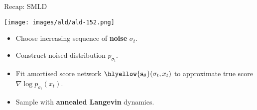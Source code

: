\begin{frame}{Recap: SMLD}
 \begin{center}
        \texttt{[image: images/ald/ald-152.png]}
    \end{center}
\begin{itemize} [triangle]
    \item Choose increasing sequence of \textbf{noise} $\sigma_t$.
    \item Construct noised distribution $p_{\sigma_t}$.
    \item Fit amortised score network $\hlyellow{\mathbf{s}_\theta}(\sigma_t, x_t)$ to approximate true score $\nabla \log p_{\sigma_t}(x_t)$.
    \item Sample with \textbf{annealed Langevin} dynamics.
\end{itemize}
%
\end{frame}
